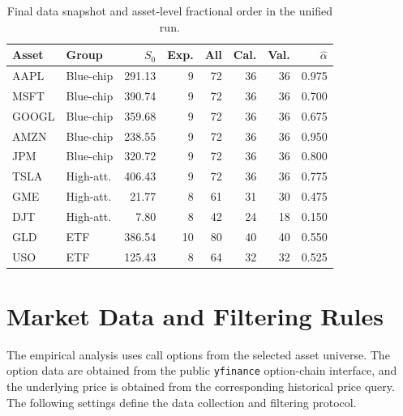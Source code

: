 \documentclass[11pt,a4paper]{report}
\begin{document}
\begin{table}[htbp]
\centering
\scriptsize
\begin{tabular}{llrrrrrr}
\toprule
Asset & Group & $S_0$ & Exp. & All & Cal. & Val. & $\widehat{\alpha}$ \\
\midrule
AAPL & Blue-chip & 291.13 & 9 & 72 & 36 & 36 & 0.975 \\
MSFT & Blue-chip & 390.74 & 9 & 72 & 36 & 36 & 0.700 \\
GOOGL & Blue-chip & 359.68 & 9 & 72 & 36 & 36 & 0.675 \\
AMZN & Blue-chip & 238.55 & 9 & 72 & 36 & 36 & 0.950 \\
JPM & Blue-chip & 320.72 & 9 & 72 & 36 & 36 & 0.800 \\
TSLA & High-att. & 406.43 & 9 & 72 & 36 & 36 & 0.775 \\
GME & High-att. & 21.77 & 8 & 61 & 31 & 30 & 0.475 \\
DJT & High-att. & 7.80 & 8 & 42 & 24 & 18 & 0.150 \\
GLD & ETF & 386.54 & 10 & 80 & 40 & 40 & 0.550 \\
USO & ETF & 125.43 & 8 & 64 & 32 & 32 & 0.525 \\
\bottomrule
\end{tabular}
\caption{Final data snapshot and asset-level fractional order in the unified run.}
\label{tab:repro_asset_snapshot}
\end{table}

\section{Market Data and Filtering Rules}

The empirical analysis uses call options from the selected asset universe. The option data are obtained from the public \texttt{yfinance} option-chain interface, and the underlying price is obtained from the corresponding historical price query. The following settings define the data collection and filtering protocol.
\end{document}
